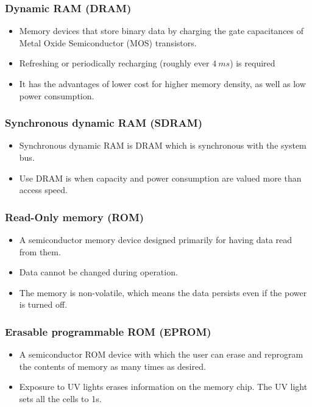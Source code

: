 \documentclass[11pt]{article}
\begin{document}
\subsubsection{Dynamic RAM (DRAM)}
\label{sec:org9f25343}
\begin{itemize}
\item Memory devices that store binary data by charging the gate capacitances of Metal Oxide Semiconductor (MOS) transistors.
\item Refreshing or periodically recharging (roughly ever \(\qty{4}{ms}\)) is required
\item It has the advantages of lower cost for higher memory density, as well as low power consumption.
\end{itemize}

\subsubsection{Synchronous dynamic RAM (SDRAM)}
\label{sec:orgfef59fe}
\begin{itemize}
\item Synchronous dynamic RAM is DRAM which is synchronous with the system bus.
\item Use DRAM is when capacity and power consumption are valued more than access speed.
\end{itemize}

\subsubsection{Read-Only memory (ROM)}
\label{sec:org9b26e7f}
\begin{itemize}
\item A semiconductor memory device designed primarily for having data read from them.
\item Data cannot be changed during operation.
\item The memory is non-volatile, which means the data persists even if the power is turned off.
\end{itemize}

\subsubsection{Erasable programmable ROM (EPROM)}
\label{sec:org50947ff}
\begin{itemize}
\item A semiconductor ROM device with which the user can erase and reprogram the contents of memory as many times as desired.
\item Exposure to UV lights erases information on the memory chip. The UV light sets all the cells to 1s.
\end{itemize}
\end{document}

